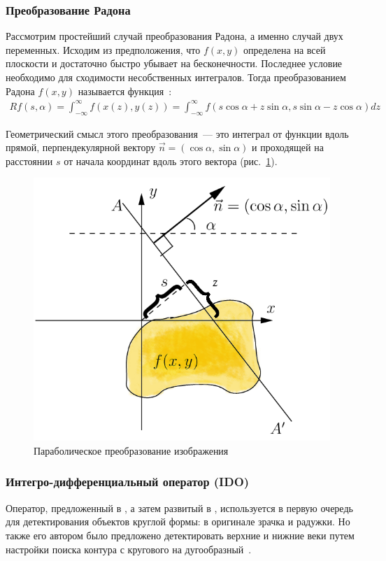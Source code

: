 \documentclass[12pt]{article} %
\begin{document}
\subsubsection{Преобразование Радона}

Рассмотрим простейший случай преобразования Радона, а именно случай двух переменных. Исходим из предположения, что $f(x,y)$ определена на всей плоскости и достаточно быстро убывает на бесконечности. Последнее условие необходимо для сходимости несобственных интегралов. Тогда преобразованием Радона $f(x,y)$ называется функция~\cite{Radon}:
\begin{gather}\label{radon}
	Rf(s, \alpha) = \int_{-\infty}^{\infty}{f(x(z),y(z))} = \int_{-\infty}^{\infty}{f(s\cos{\alpha}+z\sin{\alpha}, s\sin{\alpha}-z\cos{\alpha})dz}
\end{gather}

Геометрический смысл этого преобразования~--- это интеграл от функции вдоль прямой, перпендекулярной вектору $\vec{n}=(\cos{\alpha}, \sin{\alpha})$ и проходящей на расстоянии $s$ от начала координат вдоль этого вектора (рис.~\ref{fig:Radon_transform}).
\begin{figure}[h]
	
	\centering
	
	\includegraphics[width=0.5\linewidth]{Radon_transform.jpg}
	
	\caption{Параболическое преобразование изображения}
	
	\label{fig:Radon_transform}
	
\end{figure}

\subsubsection{Интегро-дифференциальный оператор (IDO)}

Оператор, предложенный в \cite{Daugman2}, а затем развитый в \cite{Daugman4, Daugman, Daugman3}, используется в первую очередь для детектирования объектов круглой формы: в оригинале зрачка и радужки. Но также его автором было предложено детектировать верхние и нижние веки путем настройки поиска контура с кругового на дугообразный~\cite{Daugman}.
\end{document}
